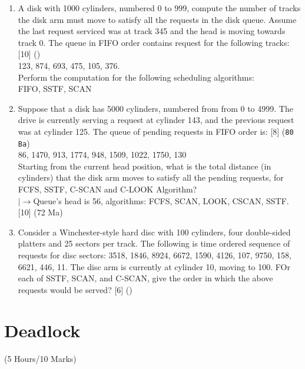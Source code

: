 \documentclass[12pt]{article}
\newcommand{\lb}{\\$\left|\rightarrow\right.$}
\begin{document}
\begin{enumerate}
			\item A disk with 1000 cylinders, numbered 0 to 999, compute the number of tracks the disk arm must move to satisfy all the requests in the disk queue. Assume the last request serviced was at track 345 and the head is moving towards track 0. The queue in FIFO order contains request for the following tracks: \hfill [10] ()\\
			123, 874, 693, 475, 105, 376.\\
			Perform the computation for the following scheduling algorithms:\\
			FIFO, SSTF, SCAN

			\item Suppose that a disk has 5000 cylinders, numbered from from 0 to 4999. The drive is currently serving a request at cylinder 143, and the previous request was at cylinder 125. The queue of pending requests in FIFO order is: \hfill [8] (\texttt{80 Ba})\\
			86, 1470, 913, 1774, 948, 1509, 1022, 1750, 130\\
			Starting from the current head position, what is the total distance (in cylinders) that the disk arm moves to satisfy all the pending requests, for FCFS, SSTF, C-SCAN and C-LOOK Algorithm?
			\lb Queue's head is 56, algorithms: FCFS, SCAN, LOOK, CSCAN, SSTF. \hfill [10] (72 Ma)

			\item Consider a Winchester-style hard disc with 100 cylinders, four double-sided platters and 25 sectors per track. The following is time ordered sequence of requests for disc sectors: {3518, 1846, 8924, 6672, 1590, 4126, 107, 9750, 158, 6621, 446, 11}. The disc arm is currently at cylinder 10, moving to 100. FOr each of SSTF, SCAN, and C-SCAN, give the order in which the above requests would be served? \hfill [6] ()
		\end{enumerate}

\pagebreak
\section{Deadlock}
	\begin{center}(5 Hours/10 Marks)\end{center}
\end{document}
